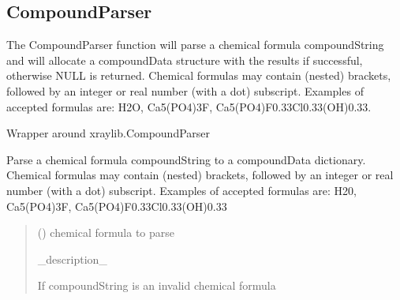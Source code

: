 \documentclass[letterpaper,10pt,english,openany,oneside]{sphinxmanual}
\begin{document}
\subsection{CompoundParser}
\label{\detokenize{api/compound_parser:compoundparser}}
\sphinxAtStartPar
The CompoundParser function will parse a chemical formula compoundString and
will allocate a compoundData structure with the results if successful,
otherwise NULL is returned. Chemical formulas may contain (nested) brackets,
followed by an integer or real number (with a dot) subscript. Examples of
accepted formulas are: H2O, Ca5(PO4)3F, Ca5(PO4)F0.33Cl0.33(OH)0.33.

\begin{fulllineitems}
\label{\detokenize{api/compound_parser:dxraylib.CompoundParser}}
\pysigstartsignatures
{}
\pysigstopsignatures
\sphinxAtStartPar
Wrapper around xraylib.CompoundParser

\sphinxAtStartPar
Parse a chemical formula compoundString to a compoundData dictionary.
Chemical formulas may contain (nested) brackets, followed by an
integer or real number (with a dot) subscript. Examples of accepted
formulas are: H20, Ca5(PO4)3F, Ca5(PO4)F0.33Cl0.33(OH)0.33
\begin{quote}\begin{description}
\sphinxAtStartPar
{} () \textendash{} chemical formula to parse

\sphinxAtStartPar
\_description\_

\sphinxAtStartPar
{\hyperref[\detokenize{api/compound_parser:dxraylib.xraylib_parser.compoundData}]{}}

\sphinxAtStartPar
{} \textendash{} If compoundString is an invalid chemical formula

\end{description}\end{quote}

\end{fulllineitems}
\end{document}
